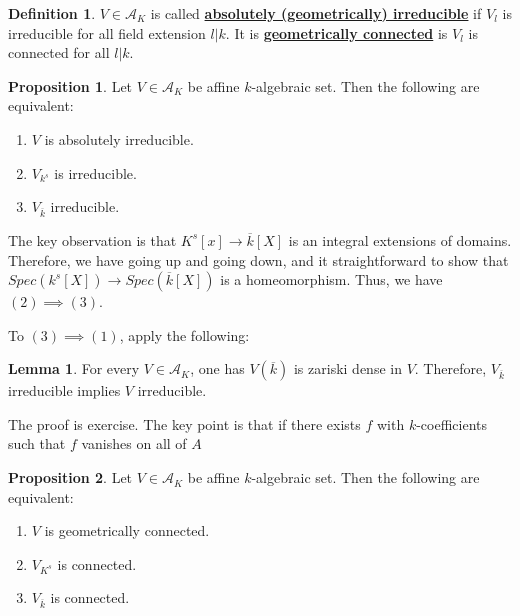 \documentclass{article}
\theoremstyle{definition}
\theoremstyle{definition}
\newtheorem{definition}{Definition}[theorem]
\theoremstyle{definition}
\theoremstyle{definition}
\newtheorem{proposition}{Proposition}[theorem]
\theoremstyle{definition}
\newtheorem{lemma}[theorem]{Lemma}
\theoremstyle{definition}
\theoremstyle{definition}
\begin{document}
\begin{tcolorbox}[colback=purple!5!white,colframe=purple!75!black]
\begin{definition}
$V\in\mathcal{A}_K$ is called \underline{\textbf{absolutely (geometrically) irreducible}} if $V_l$ is irreducible for all field extension $l|k$. It is \underline{\textbf{geometrically connected}} is $V_l$ is connected for all $l|k$.
\end{definition}
\end{tcolorbox}

\begin{tcolorbox}[colback=blue!5!white,colframe=blue!30!white]
\begin{proposition}
Let $V\in \mathcal{A}_K$ be affine $k$-algebraic set. Then the following are equivalent:
\begin{enumerate}
    \item $V$ is absolutely irreducible.
    \item $V_{k^s}$ is irreducible.
    \item $V_{\overline{k}}$ irreducible.
\end{enumerate}
\end{proposition}
\end{tcolorbox}
The key observation is that $K^s[x]\to \overline{k}[X]$ is an integral extensions of domains. Therefore, we have going up and going down, and it straightforward to show that $Spec(k^s[X])\to Spec(\overline{k}[X])$ is a homeomorphism. Thus, we have $(2)\implies (3)$. 

To $(3)\implies (1)$, apply the following: 

\begin{tcolorbox}
\begin{lemma}
For every $V\in \mathcal{A}_K$, one has $V(\overline{k})$ is zariski dense in $V$. Therefore, $V_{\overline{k}}$ irreducible implies $V$ irreducible. 
\end{lemma}
\end{tcolorbox}
The proof is exercise. The key point is that if there exists $f$ with $k$-coefficients such that $f$ vanishes on all of $A$



\begin{tcolorbox}[colback=blue!5!white,colframe=blue!30!white]
\begin{proposition}
    Let $V\in \mathcal{A}_K$ be affine $k$-algebraic set. Then the following are equivalent:
    \begin{enumerate}
        \item $V$ is geometrically connected. 
        \item $V_{K^s}$ is connected.
        \item $V_{\overline{k}}$ is connected.
    \end{enumerate}
\end{proposition}
\end{tcolorbox}
\end{document}
